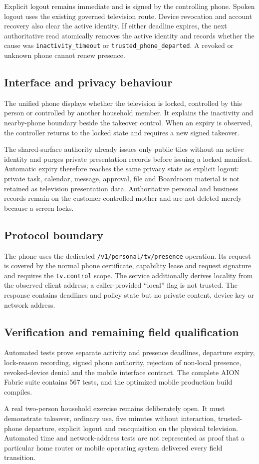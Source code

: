Explicit logout remains immediate and is signed by the controlling phone.  Spoken
logout uses the existing governed television route.  Device revocation and account
recovery also clear the active identity.  If either deadline expires, the next
authoritative read atomically removes the active identity and records whether the
cause was \texttt{inactivity\_timeout} or
\texttt{trusted\_phone\_departed}.  A revoked or unknown phone cannot renew
presence.

\subsection{Interface and privacy behaviour}

The unified phone displays whether the television is locked, controlled by this
person or controlled by another household member.  It explains the inactivity and
nearby-phone boundary beside the takeover control.  When an expiry is observed, the
controller returns to the locked state and requires a new signed takeover.

The shared-surface authority already issues only public tiles without an active
identity and purges private presentation records before issuing a locked manifest.
Automatic expiry therefore reaches the same privacy state as explicit logout:
private task, calendar, message, approval, file and Boardroom material is not retained
as television presentation data.  Authoritative personal and business records remain
on the customer-controlled mother and are not deleted merely because a screen locks.

\subsection{Protocol boundary}

The phone uses the dedicated
\texttt{/v1/personal/tv/presence} operation.  Its request is covered by the normal
phone certificate, capability lease and request signature and requires the
\texttt{tv.control} scope.  The service additionally derives locality from the
observed client address; a caller-provided ``local'' flag is not trusted.  The
response contains deadlines and policy state but no private content, device key or
network address.

\subsection{Verification and remaining field qualification}

Automated tests prove separate activity and presence deadlines, departure expiry,
lock-reason recording, signed phone authority, rejection of non-local presence,
revoked-device denial and the mobile interface contract.  The complete AION Fabric
suite contains 567 tests, and the optimized mobile production build compiles.

A real two-person household exercise remains deliberately open.  It must demonstrate
takeover, ordinary use, five minutes without interaction, trusted-phone departure,
explicit logout and reacquisition on the physical television.  Automated time and
network-address tests are not represented as proof that a particular home router or
mobile operating system delivered every field transition.
